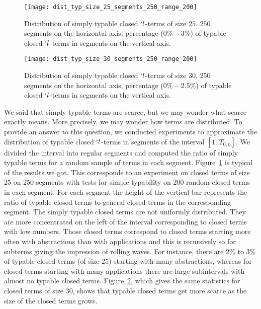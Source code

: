 \documentclass{jfp1}
\begin{document}
\begin{figure}[htb!]
  \centering
   \texttt{[image: dist\_typ\_size\_25\_segments\_250\_range\_200]}
\ifJFP
\else
\\\centerline{}
\fi
  \caption{Distribution of simply typable closed $`l$-terms of size \textbf{$25$}. $250$ segments on the
    horizontal axis, percentage ($0\%$ -- $3\%$) of typable closed $`l$-terms in segments on the vertical axis.}
  \label{fig:dist_typed_size_25}
\end{figure}

\begin{figure}[htb!]
  \centering
   \texttt{[image: dist\_typ\_size\_30\_segments\_250\_range\_200]}
 \ifJFP
\else
\\\centerline{}
\fi
\caption{Distribution of simply typable closed $`l$-terms of size
  \textbf{$30$}. $250$ segments on the horizontal axis, percentage ($0\%$ -- $2.5\%$)
  of typable closed $`l$-terms in segments on the vertical axis.}
  \label{fig:dist_typed_size_30}
\end{figure}


We said that simply typable terms are scarce, but we may wonder what scarce exactly
means.  More precisely, we may wonder how terms are distributed.  To provide an
answer to this question, we conducted experiments to approximate the distribution of
typable closed $`l$-terms  in segments of the interval $[1..T_{0,n}]$. We divided the
interval into regular segments and computed the ratio of simply typable terms
for a random sample of terms in each segment. 
Figure~\ref{fig:dist_typed_size_25} is typical of the results we got.  This
corresponds to an experiment on closed terms of size $25$ on $250$ segments with tests for
simple typability on $200$ random closed terms in each segment.  For each segment the height
of the vertical bar represents the ratio of typable closed terms to general closed terms in the corresponding
segment.   The simply typable closed terms are not uniformly distributed.  They
are more concentrated on the left of the interval corresponding to closed terms with low
numbers.  Those closed terms correspond to closed terms starting more often with abstractions than
with applications and this is recursively so for subterms giving the impression of
rolling waves.  For instance, there are $2\%$ to $3\%$ of typable closed terms (of size
$25$) starting with many abstractions, whereas for closed terms starting with many
applications there are large subintervals with almost no typable closed terms.
Figure~\ref{fig:dist_typed_size_30}, which gives the same statistics for closed terms of
size $30$, shows that typable closed terms get more scarce as the size of the closed terms grows.
\end{document}
